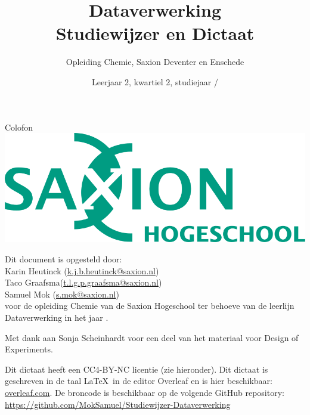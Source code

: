 \documentclass[a4paper,12pt,oneside]{book}
\title{Dataverwerking \\ Studiewijzer en Dictaat }
\author{Opleiding Chemie, Saxion Deventer en Enschede}
\date{Leerjaar 2, kwartiel 2, studiejaar \the\year/\NextYear{}}
\begin{document}
\lstset{language=r}
\lstset{style=mystyle}

\maketitle
\begin{center}
{\Large Colofon}\\
\vspace{15mm}
\includegraphics[width=0.7\linewidth]{img/lg_saxion_rgb.png}
\end{center}
\vspace{10mm}
Dit document is opgesteld door:\\
Karin Heutinck (\href{k.j.b.heutinck@saxion.nl}{\textsf{k.j.b.heutinck@saxion.nl}})\\
Taco Graafsma(\href{t.l.g.p.graafsma@saxion.nl}{\textsf{t.l.g.p.graafsma@saxion.nl}})\\
Samuel Mok (\href{s.mok@saxion.nl}{\textsf{s.mok@saxion.nl}})\\
voor de opleiding Chemie van de Saxion Hogeschool ter behoeve van de leerlijn Dataverwerking in het jaar \the\year.

Met dank aan Sonja Scheinhardt voor een deel van het materiaal voor Design of Experiments.

Dit dictaat heeft een CC4-BY-NC licentie (zie hieronder). Dit dictaat is geschreven in de taal \LaTeX\ in de editor Overleaf en is hier beschikbaar: \href{https://www.overleaf.com/read/sgpyzkvsfkpc
}{overleaf.com}. De broncode is beschikbaar op de volgende GitHub repository: \href{https://github.com/MokSamuel/Studiewijzer-Dataverwerking}{https://github.com/MokSamuel/Studiewijzer-Dataverwerking}


\doclicenseThis


\tableofcontents







\begin{appendices}

\end{appendices}
\end{document}
